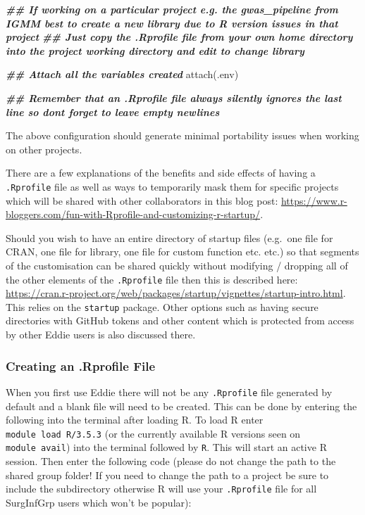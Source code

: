 \documentclass[
]{book}
\newenvironment{Shaded}{\begin{snugshade}}{\end{snugshade}}
\newcommand{\DocumentationTok}[1]{\textcolor[rgb]{0.56,0.35,0.01}{\textbf{\textit{#1}}}}
\newcommand{\FunctionTok}[1]{\textcolor[rgb]{0.00,0.00,0.00}{#1}}
\newcommand{\NormalTok}[1]{#1}
\begin{document}
\begin{Shaded}
\begin{Highlighting}[]
\DocumentationTok{\#\# If working on a particular project e.g. the gwas\_pipeline from IGMM best to create a new library due to R version issues in that project}
\DocumentationTok{\#\# Just copy the .Rprofile file from your own home directory into the project working directory and edit to change library}


\DocumentationTok{\#\# Attach all the variables created}
\FunctionTok{attach}\NormalTok{(.env)}


\DocumentationTok{\#\# Remember that an .Rprofile file always silently ignores the last line so don\textquotesingle{}t forget to leave empty newlines}
\end{Highlighting}
\end{Shaded}

The above configuration should generate minimal portability issues when working on other projects.

There are a few explanations of the benefits and side effects of having a \texttt{.Rprofile} file as well as ways to temporarily mask them for specific projects which will be shared with other collaborators in this blog post: \url{https://www.r-bloggers.com/fun-with-Rprofile-and-customizing-r-startup/}.

Should you wish to have an entire directory of startup files (e.g.~one file for CRAN, one file for library, one file for custom function etc. etc.) so that segments of the customisation can be shared quickly without modifying / dropping all of the other elements of the \texttt{.Rprofile} file then this is described here: \url{https://cran.r-project.org/web/packages/startup/vignettes/startup-intro.html}. This relies on the \texttt{startup} package. Other options such as having secure directories with GitHub tokens and other content which is protected from access by other Eddie users is also discussed there.

\hypertarget{creating-an-.rprofile-file}{%
\subsubsection{Creating an .Rprofile File}\label{creating-an-.rprofile-file}}

When you first use Eddie there will not be any \texttt{.Rprofile} file generated by default and a blank file will need to be created. This can be done by entering the following into the terminal after loading R. To load R enter \texttt{module\ load\ R/3.5.3} (or the currently available R versions seen on \texttt{module\ avail}) into the terminal followed by \texttt{R}. This will start an active R session. Then enter the following code (please do not change the path to the shared group folder! If you need to change the path to a project be sure to include the subdirectory otherwise R will use your \texttt{.Rprofile} file for all SurgInfGrp users which won't be popular):
\end{document}
